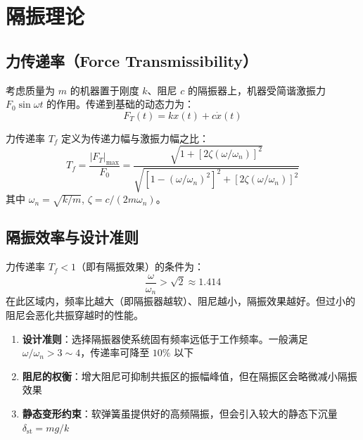\section{隔振理论}
\subsection{力传递率（Force Transmissibility）}
考虑质量为 $m$ 的机器置于刚度 $k$、阻尼 $c$ 的隔振器上，机器受简谐激振力 $F_0\sin\omega t$ 的作用。传递到基础的动态力为：
\[
F_T(t) = k x(t) + c\dot{x}(t)
\]

\begin{myformula}
力传递率 $T_f$ 定义为传递力幅与激振力幅之比：
\[
T_f = \frac{|F_T|_{\max}}{F_0} = \frac{\sqrt{1 + [2\zeta(\omega/\omega_n)]^{2}}}{\sqrt{[1 - (\omega/\omega_n)^{2}]^{2} + [2\zeta(\omega/\omega_n)]^{2}}}
\]
其中 $\omega_n = \sqrt{k/m}$, $\zeta = c/(2m\omega_n)$。
\end{myformula}

\subsection{隔振效率与设计准则}
\begin{definition}[隔振的有效频率范围]
力传递率 $T_f < 1$（即有隔振效果）的条件为：
\[
\frac{\omega}{\omega_n} > \sqrt{2} \approx 1.414
\]
在此区域内，频率比越大（即隔振器越软）、阻尼越小，隔振效果越好。但过小的阻尼会恶化共振穿越时的性能。
\end{definition}

\begin{enumerate}
    \item \textbf{设计准则}：选择隔振器使系统固有频率远低于工作频率。一般满足 $\omega/\omega_n > 3 \sim 4$，传递率可降至 $10\%$ 以下
    \item \textbf{阻尼的权衡}：增大阻尼可抑制共振区的振幅峰值，但在隔振区会略微减小隔振效果
    \item \textbf{静态变形约束}：软弹簧虽提供好的高频隔振，但会引入较大的静态下沉量 $\delta_{\text{st}} = mg/k$
\end{enumerate}

